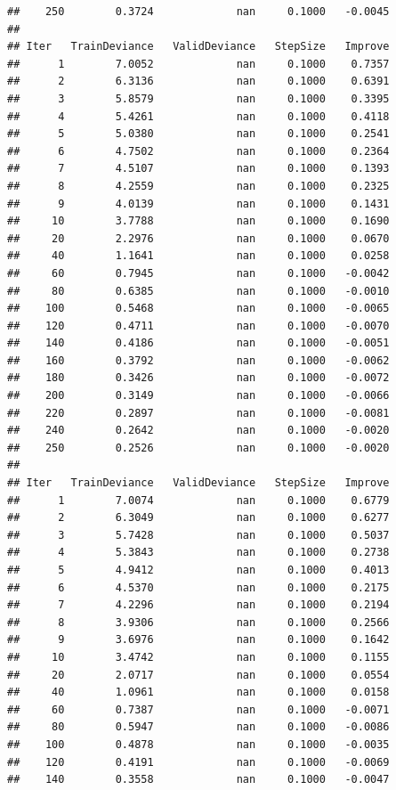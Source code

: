 \documentclass[
]{book}
\begin{document}
\begin{verbatim}
##    250        0.3724             nan     0.1000   -0.0045
## 
## Iter   TrainDeviance   ValidDeviance   StepSize   Improve
##      1        7.0052             nan     0.1000    0.7357
##      2        6.3136             nan     0.1000    0.6391
##      3        5.8579             nan     0.1000    0.3395
##      4        5.4261             nan     0.1000    0.4118
##      5        5.0380             nan     0.1000    0.2541
##      6        4.7502             nan     0.1000    0.2364
##      7        4.5107             nan     0.1000    0.1393
##      8        4.2559             nan     0.1000    0.2325
##      9        4.0139             nan     0.1000    0.1431
##     10        3.7788             nan     0.1000    0.1690
##     20        2.2976             nan     0.1000    0.0670
##     40        1.1641             nan     0.1000    0.0258
##     60        0.7945             nan     0.1000   -0.0042
##     80        0.6385             nan     0.1000   -0.0010
##    100        0.5468             nan     0.1000   -0.0065
##    120        0.4711             nan     0.1000   -0.0070
##    140        0.4186             nan     0.1000   -0.0051
##    160        0.3792             nan     0.1000   -0.0062
##    180        0.3426             nan     0.1000   -0.0072
##    200        0.3149             nan     0.1000   -0.0066
##    220        0.2897             nan     0.1000   -0.0081
##    240        0.2642             nan     0.1000   -0.0020
##    250        0.2526             nan     0.1000   -0.0020
## 
## Iter   TrainDeviance   ValidDeviance   StepSize   Improve
##      1        7.0074             nan     0.1000    0.6779
##      2        6.3049             nan     0.1000    0.6277
##      3        5.7428             nan     0.1000    0.5037
##      4        5.3843             nan     0.1000    0.2738
##      5        4.9412             nan     0.1000    0.4013
##      6        4.5370             nan     0.1000    0.2175
##      7        4.2296             nan     0.1000    0.2194
##      8        3.9306             nan     0.1000    0.2566
##      9        3.6976             nan     0.1000    0.1642
##     10        3.4742             nan     0.1000    0.1155
##     20        2.0717             nan     0.1000    0.0554
##     40        1.0961             nan     0.1000    0.0158
##     60        0.7387             nan     0.1000   -0.0071
##     80        0.5947             nan     0.1000   -0.0086
##    100        0.4878             nan     0.1000   -0.0035
##    120        0.4191             nan     0.1000   -0.0069
##    140        0.3558             nan     0.1000   -0.0047

\end{verbatim}
\end{document}
